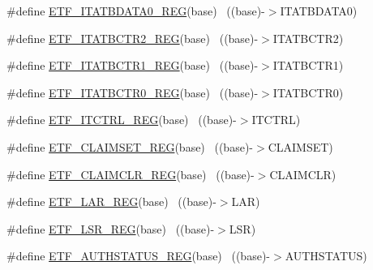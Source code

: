 \begin{DoxyCompactItemize}
\item 
\#define \hyperlink{group___e_t_f___register___accessor___macros_ga86a704f3527d5df411f99ec8f9676d3d}{E\+T\+F\+\_\+\+I\+T\+A\+T\+B\+D\+A\+T\+A0\+\_\+\+R\+EG}(base)                              ~((base)-\/$>$I\+T\+A\+T\+B\+D\+A\+T\+A0)
\item 
\#define \hyperlink{group___e_t_f___register___accessor___macros_gaa9b800e446803bbceb31252ffb731292}{E\+T\+F\+\_\+\+I\+T\+A\+T\+B\+C\+T\+R2\+\_\+\+R\+EG}(base)                                ~((base)-\/$>$I\+T\+A\+T\+B\+C\+T\+R2)
\item 
\#define \hyperlink{group___e_t_f___register___accessor___macros_ga44f6405ca9c25db97a240bd1aed17297}{E\+T\+F\+\_\+\+I\+T\+A\+T\+B\+C\+T\+R1\+\_\+\+R\+EG}(base)                                ~((base)-\/$>$I\+T\+A\+T\+B\+C\+T\+R1)
\item 
\#define \hyperlink{group___e_t_f___register___accessor___macros_ga6ebd31f02cbd86ae5ef2ed2df8ca432d}{E\+T\+F\+\_\+\+I\+T\+A\+T\+B\+C\+T\+R0\+\_\+\+R\+EG}(base)                                ~((base)-\/$>$I\+T\+A\+T\+B\+C\+T\+R0)
\item 
\#define \hyperlink{group___e_t_f___register___accessor___macros_ga918b6dc59d132cd28982b2db5a9da5e3}{E\+T\+F\+\_\+\+I\+T\+C\+T\+R\+L\+\_\+\+R\+EG}(base)                                      ~((base)-\/$>$I\+T\+C\+T\+RL)
\item 
\#define \hyperlink{group___e_t_f___register___accessor___macros_gaf42e2c82c7c3f8b0b92c0220651a307b}{E\+T\+F\+\_\+\+C\+L\+A\+I\+M\+S\+E\+T\+\_\+\+R\+EG}(base)                                  ~((base)-\/$>$C\+L\+A\+I\+M\+S\+ET)
\item 
\#define \hyperlink{group___e_t_f___register___accessor___macros_ga312f63051726e4353cc7327885a2944c}{E\+T\+F\+\_\+\+C\+L\+A\+I\+M\+C\+L\+R\+\_\+\+R\+EG}(base)                                  ~((base)-\/$>$C\+L\+A\+I\+M\+C\+LR)
\item 
\#define \hyperlink{group___e_t_f___register___accessor___macros_gad3ed858ce6cb420afbb17f92ccd66aa1}{E\+T\+F\+\_\+\+L\+A\+R\+\_\+\+R\+EG}(base)                                            ~((base)-\/$>$L\+AR)
\item 
\#define \hyperlink{group___e_t_f___register___accessor___macros_gab11d6e472c1d965bcf67965110dfdc3d}{E\+T\+F\+\_\+\+L\+S\+R\+\_\+\+R\+EG}(base)                                            ~((base)-\/$>$L\+SR)
\item 
\#define \hyperlink{group___e_t_f___register___accessor___macros_ga9f4398ed01d6b173c9dcb969e6188d5e}{E\+T\+F\+\_\+\+A\+U\+T\+H\+S\+T\+A\+T\+U\+S\+\_\+\+R\+EG}(base)                              ~((base)-\/$>$A\+U\+T\+H\+S\+T\+A\+T\+US)

\end{DoxyCompactItemize}
